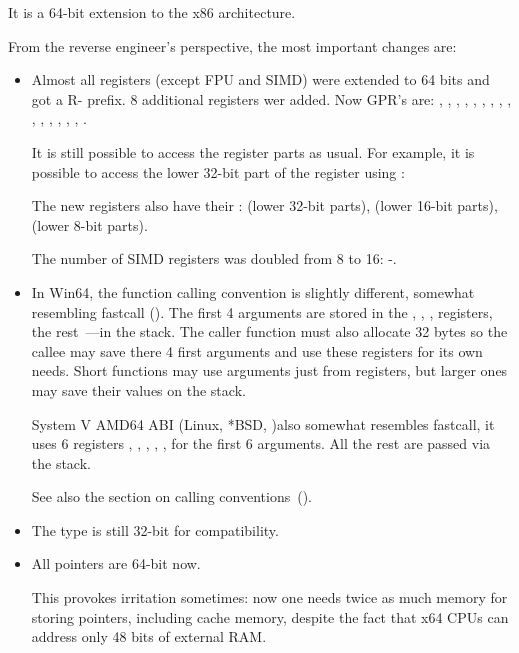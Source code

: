 
\label{x86-64}

It is a 64-bit extension to the x86 architecture.

From the reverse engineer's perspective, the most important changes are:

\myindex{\CLanguageElements!\Pointers}
\begin{itemize}

\item

Almost all registers (except FPU and SIMD) were extended to 64 bits and got a R- prefix.
8 additional registers wer added.
Now \ac{GPR}'s are: \RAX, \RBX, \RCX, \RDX, 
\RBP, \RSP, \RSI, \RDI, , , , 
, , , , . 

It is still possible to access the  register parts as usual. 
For example, it is possible to access the lower 32-bit part of the \RAX register using \EAX:


The new  registers also have their :  (lower 32-bit parts),
 (lower 16-bit parts),  (lower 8-bit parts).


The number of SIMD registers was doubled from 8 to 16: -.

\item

In Win64, the function calling convention is slightly different, somewhat resembling fastcall
().
The first 4 arguments are stored in the \RCX, \RDX, ,  registers, the rest~---in the stack.
The \gls{caller} function must also allocate 32 bytes so the \gls{callee} may save there 4 first arguments and use these 
registers for its own needs.
Short functions may use arguments just from registers, but larger ones may save their values on the stack.

System V AMD64 ABI (Linux, *BSD, \MacOSX)\SysVABI also somewhat resembles
fastcall, it uses 6 registers 
\RDI, \RSI, \RDX, \RCX, ,  for the first 6 arguments.
All the rest are passed via the stack.

See also the section on calling conventions~().

\item
The \CCpp \Tint type is still 32-bit for compatibility.

\item
All pointers are 64-bit now.

This provokes irritation sometimes: now one needs twice as much memory for storing pointers,
including cache memory, despite the fact that x64 \ac{CPU}s can address only 48 bits of external 
\ac{RAM}.

\end{itemize}

